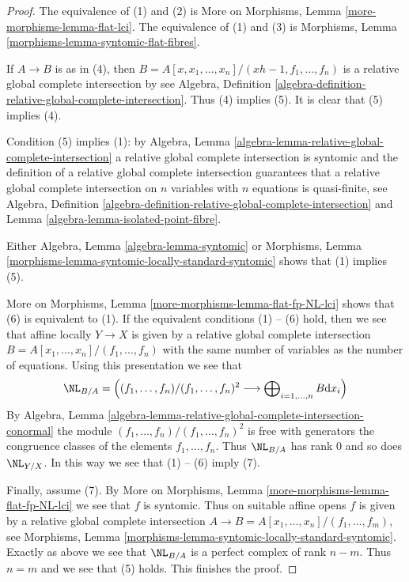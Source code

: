 \begin{proof}
The equivalence of (1) and (2) is
More on Morphisms, Lemma \ref{more-morphisms-lemma-flat-lci}.
The equivalence of (1) and (3) is 
Morphisms, Lemma \ref{morphisms-lemma-syntomic-flat-fibres}.

\medskip\noindent
If $A \to B$ is as in (4), then
$B = A[x, x_1, \ldots, x_n]/(xh - 1, f_1, \ldots, f_n)$
is a relative global complete intersection by see Algebra, Definition
\ref{algebra-definition-relative-global-complete-intersection}.
Thus (4) implies (5).
It is clear that (5) implies (4).

\medskip\noindent
Condition (5) implies (1): by
Algebra, Lemma \ref{algebra-lemma-relative-global-complete-intersection}
a relative global complete intersection is syntomic and
the definition of a relative global complete intersection
guarantees that a relative global complete intersection on
$n$ variables with $n$ equations is quasi-finite, see
Algebra, Definition
\ref{algebra-definition-relative-global-complete-intersection} and
Lemma \ref{algebra-lemma-isolated-point-fibre}.

\medskip\noindent
Either Algebra, Lemma \ref{algebra-lemma-syntomic} or
Morphisms, Lemma \ref{morphisms-lemma-syntomic-locally-standard-syntomic}
shows that (1) implies (5).

\medskip\noindent
More on Morphisms, Lemma \ref{more-morphisms-lemma-flat-fp-NL-lci} shows that
(6) is equivalent to (1). If the equivalent conditions (1) -- (6) hold,
then we see that affine locally $Y \to X$ is given by a relative global
complete intersection $B = A[x_1, \ldots, x_n]/(f_1, \ldots, f_n)$
with the same number of variables as the number of
equations. Using this presentation we see that
$$
\NL_{B/A} =\left(
(f_1, \ldots, f_n)/(f_1, \ldots, f_n)^2
\longrightarrow
\bigoplus\nolimits_{i = 1, \ldots, n} B \text{d} x_i\right)
$$
By Algebra, Lemma
\ref{algebra-lemma-relative-global-complete-intersection-conormal}
the module $(f_1, \ldots, f_n)/(f_1, \ldots, f_n)^2$
is free with generators the congruence classes of the elements
$f_1, \ldots, f_n$. Thus $\NL_{B/A}$ has rank $0$ and so does $\NL_{Y/X}$.
In this way we see that (1) -- (6) imply (7).

\medskip\noindent
Finally, assume (7). By
More on Morphisms, Lemma \ref{more-morphisms-lemma-flat-fp-NL-lci}
we see that $f$ is syntomic. Thus on suitable affine opens
$f$ is given by a relative global complete intersection
$A \to B = A[x_1, \ldots, x_n]/(f_1, \ldots, f_m)$, see
Morphisms, Lemma \ref{morphisms-lemma-syntomic-locally-standard-syntomic}.
Exactly as above we see that $\NL_{B/A}$ is a perfect complex
of rank $n - m$. Thus $n = m$ and we see that (5) holds.
This finishes the proof.
\end{proof}

